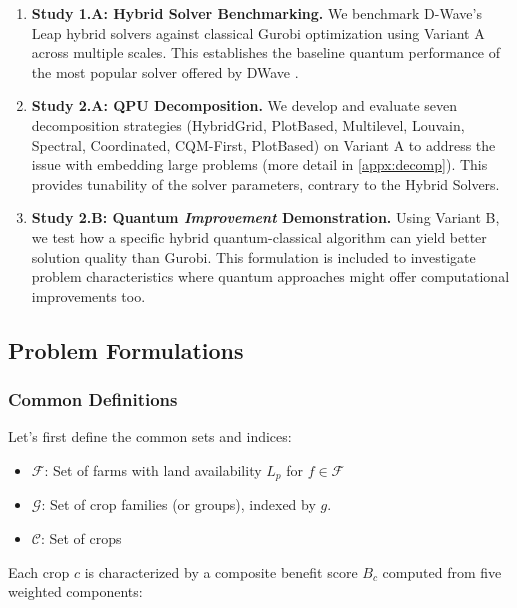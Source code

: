 \documentclass{oqireport}
\begin{document}
\begin{enumerate}
    \item \textbf{Study 1.A: Hybrid Solver Benchmarking.} We benchmark D-Wave's Leap hybrid solvers against classical Gurobi optimization using Variant A across multiple scales. This establishes the baseline quantum performance of the most popular solver offered by DWave \cite{dwave_hybrid_solver}.
    
    \item \textbf{Study 2.A: QPU Decomposition.} We develop and evaluate seven decomposition strategies (HybridGrid, PlotBased, Multilevel, Louvain, Spectral, Coordinated, CQM-First, PlotBased) on Variant A to address the issue with embedding large problems (more detail in \cref{appx:decomp}). This provides tunability of the solver parameters, contrary to the Hybrid Solvers.
    
    \item \textbf{Study 2.B: Quantum \textit{Improvement} Demonstration.} Using Variant B, we test how a specific hybrid quantum-classical algorithm can yield better solution quality than Gurobi. This formulation is included to investigate problem characteristics where quantum approaches might offer computational improvements too.
    
\end{enumerate}


\subsection{Problem Formulations}

\subsubsection{Common Definitions}



Let's first define the common sets and indices:
\begin{itemize}
    \item $\mathcal{F}$: Set of farms with land availability $L_p$ for $f \in \mathcal{F}$
    \item $\mathcal{G}$: Set of crop families (or groups), indexed by $g$.
    \item $\mathcal{C}$: Set of crops 

\end{itemize}

Each crop $c$ is characterized by a composite benefit score $B_c$ computed from five weighted components:
\end{document}
